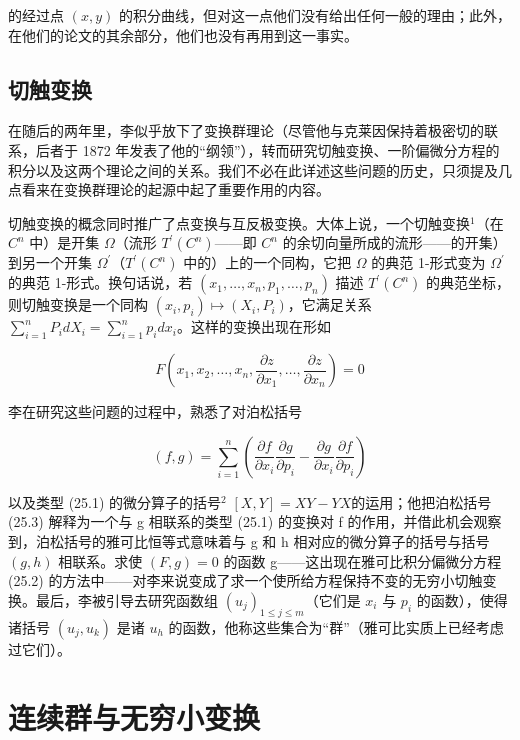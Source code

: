 的经过点 \((x,y)\) 的积分曲线，但对这一点他们没有给出任何一般的理由；此外，在他们的论文的其余部分，他们也没有再用到这一事实。

\subsection{切触变换}

在随后的两年里，李似乎放下了变换群理论（尽管他与克莱因保持着极密切的联系，后者于 1872 年发表了他的“纲领”），转而研究切触变换、一阶偏微分方程的积分以及这两个理论之间的关系。我们不必在此详述这些问题的历史，只须提及几点看来在变换群理论的起源中起了重要作用的内容。

切触变换的概念同时推广了点变换与互反极变换。大体上说，一个切触变换\(^{1}\)（在 \(C^{n}\) 中）是开集 \(\Omega\)（流形 \(T^{\prime}(C^{n})\)——即 \(C^{n}\) 的余切向量所成的流形——的开集）到另一个开集 \(\Omega^{\prime}\)（\(T^{\prime}(C^{n})\) 中的）上的一个同构，它把 \(\Omega\) 的典范 1-形式变为 \(\Omega^{\prime}\) 的典范 1-形式。换句话说，若 \((x_{1},\ldots,x_{n},p_{1},\ldots,p_{n})\) 描述 \(T^{\prime}(C^{n})\) 的典范坐标，则切触变换是一个同构 \((x_{i},p_{i})\mapsto(X_{i},P_{i})\)，它满足关系 \(\sum_{i=1}^{n}P_{i}dX_{i}=\sum_{i=1}^{n}p_{i}dx_{i}\)。这样的变换出现在形如

\[
F \left(x _ {1}, x _ {2}, \dots , x _ {n}, \frac {\partial z}{\partial x _ {1}}, \dots , \frac {\partial z}{\partial x _ {n}}\right) = 0\tag{25.2}
\]

李在研究这些问题的过程中，熟悉了对泊松括号

\[
(f, g) = \sum_ {i = 1} ^ {n} \left(\frac {\partial f}{\partial x _ {i}} \frac {\partial g}{\partial p _ {i}} - \frac {\partial g}{\partial x _ {i}} \frac {\partial f}{\partial p _ {i}}\right)\tag{25.3}
\]

以及类型 (25.1) 的微分算子的括号\(^{2}\) \([X,Y]=XY-YX\)的运用；他把泊松括号 (25.3) 解释为一个与 g 相联系的类型 (25.1) 的变换对 f 的作用，并借此机会观察到，泊松括号的雅可比恒等式意味着与 g 和 h 相对应的微分算子的括号与括号 \((g,h)\) 相联系。求使 \((F,g)=0\) 的函数 g——这出现在雅可比积分偏微分方程 (25.2) 的方法中——对李来说变成了求一个使所给方程保持不变的无穷小切触变换。最后，李被引导去研究函数组 \((u_{j})_{1\leq j\leq m}\)（它们是 \(x_{i}\) 与 \(p_{i}\) 的函数），使得诸括号 \((u_{j},u_{k})\) 是诸 \(u_{h}\) 的函数，他称这些集合为“群”（雅可比实质上已经考虑过它们）。

\section{连续群与无穷小变换}

